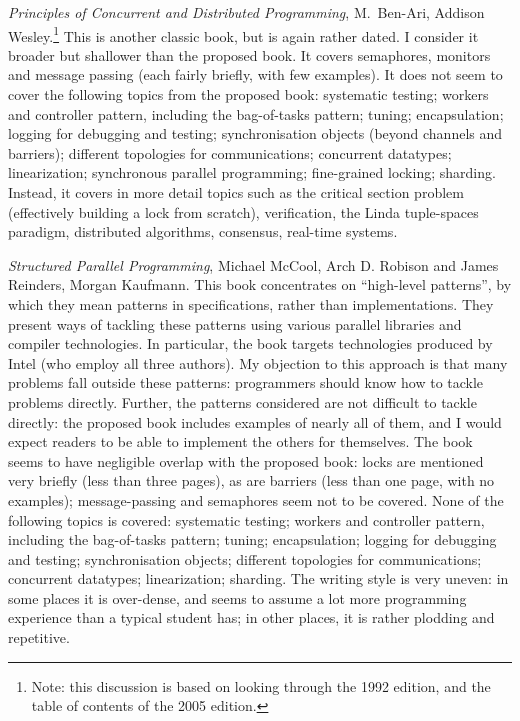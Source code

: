 \documentclass[12pt,a4paper]{article}
\begin{document}
\emph{Principles of Concurrent and Distributed Programming}, M.~Ben-Ari,
Addison Wesley.\footnote{Note: this discussion is based on looking through
  the 1992 edition, and the table of contents of the 2005 edition.}  This is
another classic book, but is again rather dated.  I consider it broader but
shallower than the proposed book.  It covers semaphores,
monitors and message passing (each fairly briefly, with few examples).  It
does not seem to cover the following topics from the proposed book: systematic
testing; workers and controller pattern, including the bag-of-tasks pattern;
tuning; encapsulation; logging for debugging and testing; synchronisation
objects (beyond channels and barriers); different topologies for
communications; concurrent datatypes; linearization; synchronous parallel
programming; fine-grained locking; sharding.
%
Instead, it covers in more detail topics such as the critical section problem
(effectively building a lock from scratch), verification, the Linda
tuple-spaces paradigm, distributed algorithms, consensus, real-time systems.

\emph{Structured Parallel Programming}, Michael McCool, Arch D. Robison and
James Reinders, Morgan Kaufmann.
%
This book concentrates on ``high-level patterns'', by which they mean patterns
in specifications, rather than implementations.  They present ways of tackling
these patterns using various parallel libraries and compiler technologies.  In
particular, the book targets technologies produced by Intel (who employ all
three authors). My objection to this approach is that many problems fall
outside these patterns: programmers should know how to tackle problems
directly.  Further, the patterns considered are not difficult to tackle
directly: the proposed book includes examples of nearly all of them, and I
would expect readers to be able to implement the others for themselves.
%
The book seems to have negligible overlap with the proposed book: locks are
mentioned very briefly (less than three pages), as are barriers (less than one
page, with no examples); message-passing and semaphores seem not to be
covered.  None of the following topics is covered: systematic testing;
workers and controller pattern, including the bag-of-tasks pattern; tuning;
encapsulation; logging for debugging and testing; synchronisation objects;
different topologies for communications; concurrent datatypes; linearization;
sharding.
%
The writing style is very uneven: in some places it is over-dense, and seems
to assume a lot more programming experience than a typical student has; in
other places, it is rather plodding and repetitive.
\end{document}
